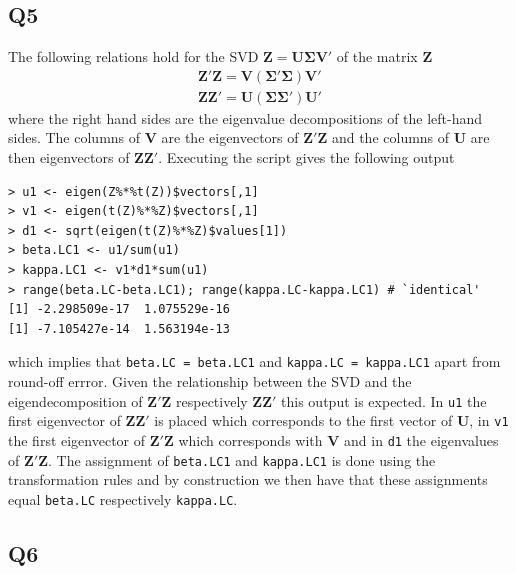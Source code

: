 \documentclass[11pt]{article}
\begin{document}
\subsection*{Q5}
The following relations hold for the SVD $ \mathbf{Z} = \mathbf{U} \mathbf{\Sigma} \mathbf{V'}$ of the matrix $\mathbf{Z}$ 
\begin{eqnarray}
\mathbf{Z'} \mathbf{Z} = \mathbf{V} ( \mathbf{\Sigma'} \mathbf{\Sigma} ) \mathbf{V'} \\
\mathbf{Z} \mathbf{Z'} = \mathbf{U} ( \mathbf{\Sigma} \mathbf{\Sigma'} ) \mathbf{U'}
\end{eqnarray}
where the right hand sides are the eigenvalue decompositions of the left-hand sides. The columns of $\mathbf{V}$ are the eigenvectors of $\mathbf{Z'} \mathbf{Z}$ and the columns of $\mathbf{U}$ are then eigenvectors of $\mathbf{Z} \mathbf{Z'}$.
Executing the script gives the following output
\begin{verbatim}
> u1 <- eigen(Z%*%t(Z))$vectors[,1]
> v1 <- eigen(t(Z)%*%Z)$vectors[,1]
> d1 <- sqrt(eigen(t(Z)%*%Z)$values[1])
> beta.LC1 <- u1/sum(u1)
> kappa.LC1 <- v1*d1*sum(u1)
> range(beta.LC-beta.LC1); range(kappa.LC-kappa.LC1) # `identical'
[1] -2.298509e-17  1.075529e-16
[1] -7.105427e-14  1.563194e-13
\end{verbatim}
which implies that \verb|beta.LC = beta.LC1| and \verb|kappa.LC = kappa.LC1| apart from round-off errror. Given the relationship between the SVD and the eigendecomposition of $\mathbf{Z'} \mathbf{Z}$ respectively $\mathbf{Z} \mathbf{Z'}$ this output is expected. In \verb|u1| the first eigenvector of $\mathbf{Z} \mathbf{Z'}$ is placed which corresponds to the first vector of $\mathbf{U}$, in \verb|v1| the first eigenvector of $\mathbf{Z'} \mathbf{Z}$ which corresponds with $\mathbf{V}$ and in \verb|d1| the eigenvalues of $\mathbf{Z'} \mathbf{Z}$. The assignment of \verb|beta.LC1| and \verb|kappa.LC1| is done using the transformation rules and by construction we then have that these assignments equal \verb|beta.LC| respectively \verb|kappa.LC|.

\subsection*{Q6}
\end{document}
